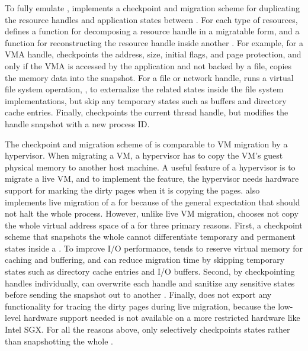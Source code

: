 To fully emulate , \thelibos{} implements
a checkpoint and migration scheme
for duplicating the resource handles and application states between \picoprocs{}.
For each type of resources, \thelibos{} defines a function for decomposing a resource handle in a migratable form,
and a function for reconstructing the resource handle inside another \picoproc{}.
For example,
for a VMA handle, \thelibos{} checkpoints the address, size, initial flags, and page protection,
and only if the VMA is accessed by the application and not backed by a file,
\thelibos{} copies the memory data into the snapshot.
For a file or network handle,
\thelibos{} runs a virtual file system operation,
,
to externalize the related states
inside the file system implementations,
but skip any temporary states such as buffers and directory cache entries.
Finally, \thelibos{} checkpoints the current thread handle, but modifies the handle snapshot with a new process ID.



The checkpoint and migration scheme of \thelibos{} is comparable to
VM migration by a hypervisor.
When migrating a VM, a hypervisor has to copy the VM's guest physical memory to another host machine.
A useful feature of a hypervisor is to migrate a live VM,
and to implement the feature, the hypervisor needs hardware support for marking the dirty pages when it is copying the pages.
\graphene{} also implements live migration of a \picoproc{} for 
because of the general expectation
that  should not halt the whole process.
However, unlike live VM migration, \graphene{} chooses not %
copy the whole virtual address space
of a \picoproc{}
for three primary reasons.
First, a checkpoint scheme that snapshots the whole \picoproc{}
cannot differentiate temporary and permanent states inside a \libos{}.
To improve I/O performance, \thelibos{} tends to reserve %
virtual memory for caching and buffering, and \thelibos{} can reduce migration time by skipping temporary states such as directory cache entries and I/O buffers.
Second, by checkpointing handles individually,
\thelibos{} can overwrite each handle and sanitize any sensitive states before sending the snapshot out to another \picoproc{}.
Finally, \thehostabi{} does not export any functionality for tracing
the dirty pages during live migration,
because the low-level hardware support needed
is not available on a more restricted hardware like Intel SGX.
For all the reasons above,
\thelibos{} only selectively checkpoints \libos{} states rather than snapshotting the whole \picoproc{}.


